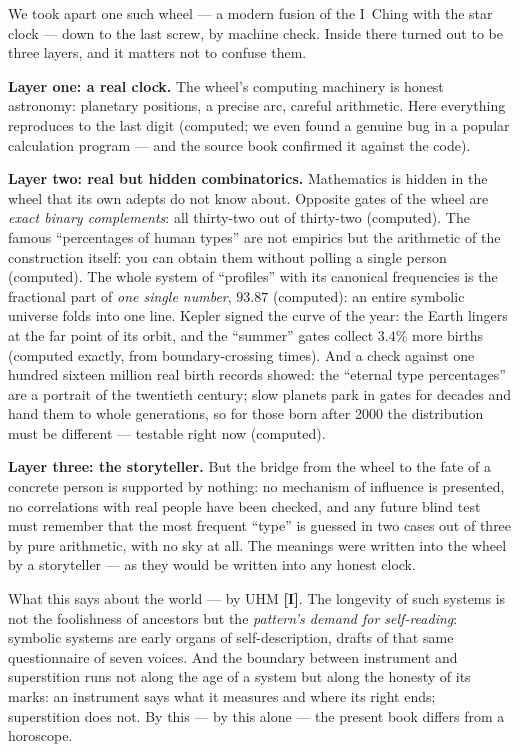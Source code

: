 \documentclass[11pt,letterpaper]{article}
\newcommand{\stI}{\textbf{[I]}\xspace}
\begin{document}
We took apart one such wheel --- a modern fusion of the I~Ching with
the star clock --- down to the last screw, by machine check. Inside
there turned out to be three layers, and it matters not to confuse
them.

\textbf{Layer one: a real clock.} The wheel's computing machinery is
honest astronomy: planetary positions, a precise arc, careful
arithmetic. Here everything reproduces to the last digit (computed;
we even found a genuine bug in a popular calculation program --- and
the source book confirmed it against the code).

\textbf{Layer two: real but hidden combinatorics.} Mathematics is
hidden in the wheel that its own adepts do not know about. Opposite
gates of the wheel are \emph{exact binary complements}: all
thirty-two out of thirty-two (computed). The famous ``percentages of
human types'' are not empirics but the arithmetic of the
construction itself: you can obtain them without polling a single
person (computed). The whole system of ``profiles'' with its
canonical frequencies is the fractional part of \emph{one single
number}, $93.87$ (computed): an entire symbolic universe folds into
one line. Kepler signed the curve of the year: the Earth lingers at
the far point of its orbit, and the ``summer'' gates collect $3.4\%$
more births (computed exactly, from boundary-crossing times). And a
check against one hundred sixteen million real birth records showed:
the ``eternal type percentages'' are a portrait of the twentieth
century; slow planets park in gates for decades and hand them to
whole generations, so for those born after 2000 the distribution
must be different --- testable right now (computed).

\textbf{Layer three: the storyteller.} But the bridge from the wheel
to the fate of a concrete person is supported by nothing: no
mechanism of influence is presented, no correlations with real
people have been checked, and any future blind test must remember
that the most frequent ``type'' is guessed in two cases out of three
by pure arithmetic, with no sky at all. The meanings were written
into the wheel by a storyteller --- as they would be written into
any honest clock.

What this says about the world --- by UHM \stI. The longevity of
such systems is not the foolishness of ancestors but the
\emph{pattern's demand for self-reading}: symbolic systems are early
organs of self-description, drafts of that same questionnaire of
seven voices. And the boundary between instrument and superstition
runs not along the age of a system but along the honesty of its
marks: an instrument says what it measures and where its right
ends; superstition does not. By this --- by this alone --- the
present book differs from a horoscope.
\end{document}
